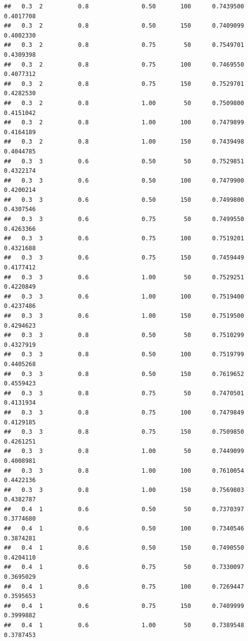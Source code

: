 \documentclass[
  spanish,
]{book}
\theoremstyle{break}
\theoremstyle{definition}
\theoremstyle{definition}
\theoremstyle{definition}
\theoremstyle{definition}
\theoremstyle{remark}
\begin{document}
\begin{verbatim}
##   0.3  2          0.8               0.50       100      0.7439500  0.4017708
##   0.3  2          0.8               0.50       150      0.7409099  0.4002330
##   0.3  2          0.8               0.75        50      0.7549701  0.4309398
##   0.3  2          0.8               0.75       100      0.7469550  0.4077312
##   0.3  2          0.8               0.75       150      0.7529701  0.4282530
##   0.3  2          0.8               1.00        50      0.7509800  0.4151042
##   0.3  2          0.8               1.00       100      0.7479899  0.4164189
##   0.3  2          0.8               1.00       150      0.7439498  0.4044785
##   0.3  3          0.6               0.50        50      0.7529851  0.4322174
##   0.3  3          0.6               0.50       100      0.7479900  0.4200214
##   0.3  3          0.6               0.50       150      0.7499800  0.4307546
##   0.3  3          0.6               0.75        50      0.7499550  0.4263366
##   0.3  3          0.6               0.75       100      0.7519201  0.4321688
##   0.3  3          0.6               0.75       150      0.7459449  0.4177412
##   0.3  3          0.6               1.00        50      0.7529251  0.4220849
##   0.3  3          0.6               1.00       100      0.7519400  0.4237486
##   0.3  3          0.6               1.00       150      0.7519500  0.4294623
##   0.3  3          0.8               0.50        50      0.7510299  0.4327919
##   0.3  3          0.8               0.50       100      0.7519799  0.4405268
##   0.3  3          0.8               0.50       150      0.7619652  0.4559423
##   0.3  3          0.8               0.75        50      0.7470501  0.4131934
##   0.3  3          0.8               0.75       100      0.7479849  0.4129185
##   0.3  3          0.8               0.75       150      0.7509850  0.4261251
##   0.3  3          0.8               1.00        50      0.7449099  0.4008981
##   0.3  3          0.8               1.00       100      0.7610054  0.4422136
##   0.3  3          0.8               1.00       150      0.7569803  0.4382787
##   0.4  1          0.6               0.50        50      0.7370397  0.3774680
##   0.4  1          0.6               0.50       100      0.7340546  0.3874281
##   0.4  1          0.6               0.50       150      0.7490550  0.4204110
##   0.4  1          0.6               0.75        50      0.7330097  0.3695029
##   0.4  1          0.6               0.75       100      0.7269447  0.3595653
##   0.4  1          0.6               0.75       150      0.7409999  0.3999882
##   0.4  1          0.6               1.00        50      0.7389548  0.3787453

\end{verbatim}
\end{document}

